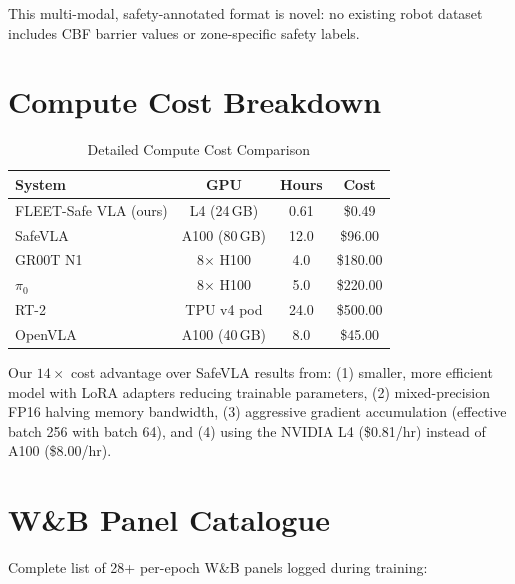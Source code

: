 \documentclass[conference]{IEEEtran}
\begin{document}
This multi-modal, safety-annotated format is novel: no existing robot dataset includes CBF barrier values or zone-specific safety labels.

\section{Compute Cost Breakdown}
\label{sec:supp_compute}

\begin{table}[h]
\centering
\caption{Detailed Compute Cost Comparison}
\begin{tabular}{@{}lccc@{}}
\toprule
\textbf{System} & \textbf{GPU} & \textbf{Hours} & \textbf{Cost} \\
\midrule
FLEET-Safe VLA (ours) & L4 (24\,GB) & 0.61 & \$0.49 \\
SafeVLA & A100 (80\,GB) & 12.0 & \$96.00 \\
GR00T N1 & 8$\times$ H100 & 4.0 & \$180.00 \\
$\pi_0$ & 8$\times$ H100 & 5.0 & \$220.00 \\
RT-2 & TPU v4 pod & 24.0 & \$500.00 \\
OpenVLA & A100 (40\,GB) & 8.0 & \$45.00 \\
\bottomrule
\end{tabular}
\end{table}

Our $14\times$ cost advantage over SafeVLA results from: (1) smaller, more efficient model with LoRA adapters reducing trainable parameters, (2) mixed-precision FP16 halving memory bandwidth, (3) aggressive gradient accumulation (effective batch 256 with batch 64), and (4) using the NVIDIA L4 (\$0.81/hr) instead of A100 (\$8.00/hr).

\section{W\&B Panel Catalogue}
\label{sec:supp_panels}

Complete list of 28+ per-epoch W\&B panels logged during training:
\end{document}
